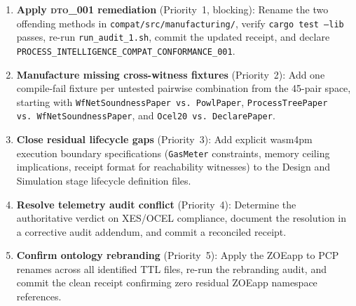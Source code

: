 \begin{enumerate}
  \item \textbf{Apply \textsc{dto\_001} remediation} (Priority~1, blocking):
    Rename the two offending methods in \texttt{compat/src/manufacturing/},
    verify \texttt{cargo test --lib} passes, re-run \texttt{run\_audit\_1.sh},
    commit the updated receipt, and declare
    \texttt{PROCESS\_INTELLIGENCE\_COMPAT\_CONFORMANCE\_001}.

  \item \textbf{Manufacture missing cross-witness fixtures} (Priority~2): Add
    one compile-fail fixture per untested pairwise combination from the 45-pair
    space, starting with \texttt{WfNetSoundnessPaper vs.\ PowlPaper},
    \texttt{ProcessTreePaper vs.\ WfNetSoundnessPaper}, and
    \texttt{Ocel20 vs.\ DeclarePaper}.

  \item \textbf{Close residual lifecycle gaps} (Priority~3): Add explicit
    wasm4pm execution boundary specifications (\texttt{GasMeter} constraints,
    memory ceiling implications, receipt format for reachability witnesses) to
    the Design and Simulation stage lifecycle definition files.

  \item \textbf{Resolve telemetry audit conflict} (Priority~4): Determine the
    authoritative verdict on XES/OCEL compliance, document the resolution in a
    corrective audit addendum, and commit a reconciled receipt.

  \item \textbf{Confirm ontology rebranding} (Priority~5): Apply the ZOEapp
    to PCP renames across all identified TTL files, re-run the rebranding audit,
    and commit the clean receipt confirming zero residual ZOEapp namespace
    references.
\end{enumerate}
